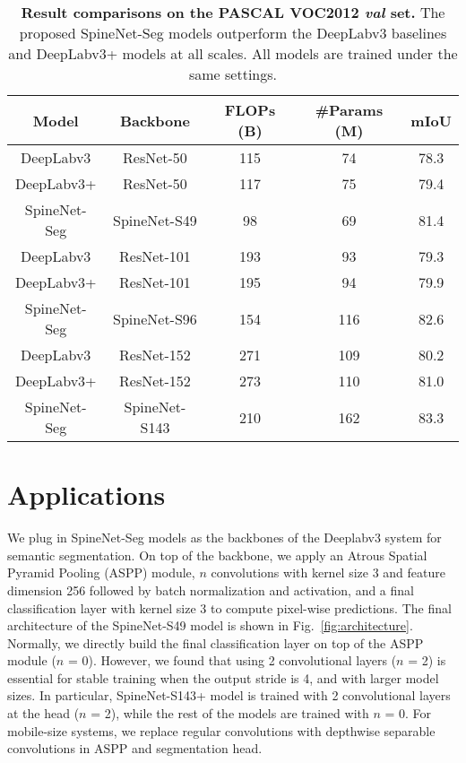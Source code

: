 \documentclass[10pt,twocolumn,letterpaper]{article}
\begin{document}
\setlength{\tabcolsep}{4pt}
\begin{table*}[t!]
\centering
\begin{tabular}{c| c | c  c | c}
  \toprule
  Model & Backbone & FLOPs (B) & \#Params (M) & mIoU  \\
  \midrule
  DeepLabv3 & ResNet-50 &  115 & 74 & 78.3 \\
  DeepLabv3+ & ResNet-50 &  117 & 75 & 79.4 \\
  SpineNet-Seg & SpineNet-S49 & 98 & 69 & 81.4 \\
  \midrule
  DeepLabv3 & ResNet-101 & 193 & 93 & 79.3 \\
  DeepLabv3+ & ResNet-101 & 195  & 94 & 79.9 \\
  SpineNet-Seg & SpineNet-S96 & 154  & 116 & 82.6 \\
  \midrule
  DeepLabv3 & ResNet-152 & 271 & 109 & 80.2 \\
  DeepLabv3+ & ResNet-152 & 273  & 110 & 81.0 \\
  SpineNet-Seg & SpineNet-S143 & 210  & 162 & 83.3 \\
  \bottomrule
\end{tabular}
\caption{\textbf{Result comparisons on the PASCAL VOC2012 \textit{val} set.} The proposed SpineNet-Seg models outperform the DeepLabv3 baselines and DeepLabv3+ models at all scales. All models are trained under the same settings.}
\label{tab:pascal_main} 
\end{table*}


\section{Applications}\label{sec:application}
We plug in SpineNet-Seg models as the backbones of the Deeplabv3 system for semantic segmentation. On top of the backbone, we apply an Atrous Spatial Pyramid Pooling (ASPP) module, $n$ convolutions with kernel size 3 and feature dimension 256 followed by batch normalization and activation, and a final classification layer with kernel size 3 to compute pixel-wise predictions. The final architecture of the SpineNet-S49 model is shown in Fig.~\ref{fig:architecture}. Normally, we directly build the final classification layer on top of the ASPP module ($n$ = 0). However, we found that using 2 convolutional layers ($n$ = 2) is essential for stable training when the output stride is 4, and with larger model sizes. In particular, SpineNet-S143+ model is trained with 2 convolutional layers at the head ($n$ = 2), while the rest of the models are trained with $n$ = 0. For mobile-size systems, we replace regular convolutions with depthwise separable convolutions in ASPP and segmentation head.
\end{document}
